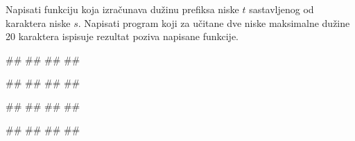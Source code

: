 \begin{Exercise}[label=NIS_22] 
 Napisati funkciju  koja izračunava dužinu prefiksa niske $t$ sastavljenog od karaktera niske $s$. 
 Napisati program koji za učitane dve niske maksimalne dužine 20 karaktera ispisuje rezultat poziva napisane funkcije.  

\begin{miditest}
\begin{upotreba}{1}
#\naslovInt#
##
##
##
\end{upotreba}
\end{miditest}
\begin{miditest}
\begin{upotreba}{2}
#\naslovInt#
##
##
##
\end{upotreba}
\end{miditest}

\begin{miditest}
\begin{upotreba}{3}
#\naslovInt#
##
##
##
\end{upotreba}
\end{miditest}
\begin{miditest}
\begin{upotreba}{4}
#\naslovInt#
##
##
##
\end{upotreba}
\end{miditest}

\end{Exercise}
\ifresenja
\begin{Answer}[ref=NIS_22]
\end{Answer}
\fi



